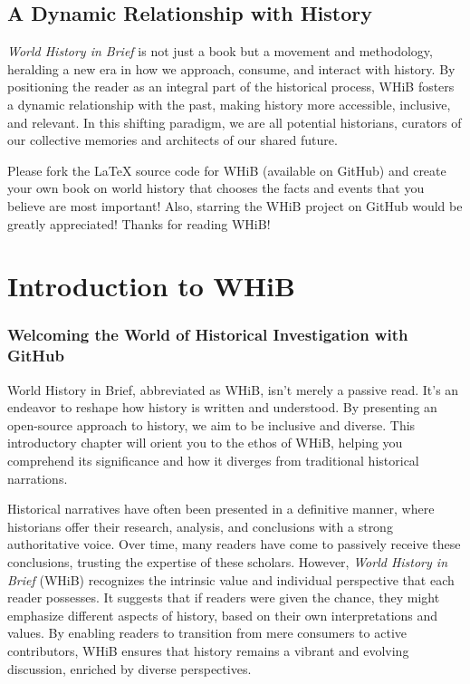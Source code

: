 \documentclass[a4paper,12pt]{book}
\begin{document}
\section*{A Dynamic Relationship with History}
\emph{World History in Brief} is not just a book but a movement and methodology, heralding a new era in how we approach, consume, and interact with history. By positioning the reader as an integral part of the historical process, WHiB fosters a dynamic relationship with the past, making history more accessible, inclusive, and relevant. In this shifting paradigm, we are all potential historians, curators of our collective memories and architects of our shared future.

Please fork the LaTeX source code for WHiB (available on GitHub) and create your own book on world history that chooses the facts and events that you believe are most important! Also, starring the WHiB project on GitHub would be greatly appreciated! Thanks for reading WHiB!

\chapter{Introduction to WHiB}
\subsection*{Welcoming the World of Historical Investigation with GitHub}
World History in Brief, abbreviated as WHiB, isn't merely a passive read. It's an endeavor to reshape how history is written and understood. By presenting an open-source approach to history, we aim to be inclusive and diverse. This introductory chapter will orient you to the ethos of WHiB, helping you comprehend its significance and how it diverges from traditional historical narrations.

Historical narratives have often been presented in a definitive manner, where historians offer their research, analysis, and conclusions with a strong authoritative voice. Over time, many readers have come to passively receive these conclusions, trusting the expertise of these scholars. However, \emph{World History in Brief} (WHiB) recognizes the intrinsic value and individual perspective that each reader possesses. It suggests that if readers were given the chance, they might emphasize different aspects of history, based on their own interpretations and values. By enabling readers to transition from mere consumers to active contributors, WHiB ensures that history remains a vibrant and evolving discussion, enriched by diverse perspectives.
\end{document}
